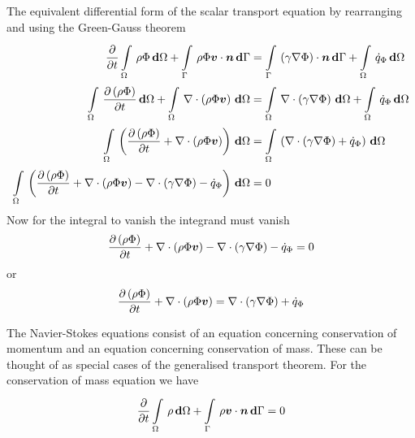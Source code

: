 The equivalent differential form of the scalar transport equation by
rearranging  and using the Green-Gauss
theorem \ie
\begin{equation}
  \begin{split}
    \delby{}{t}\gint{\Omega}{}{\rho\Phi}{\Omega}+\gint{\Gamma}{}{\dotprod{\rho\Phi\vectr{v}}{\vectr{n}}}{\Gamma}
    &=\gint{\Gamma}{}{\dotprod{\pbrac{\gamma\gradient{}{\Phi}}}{\vectr{n}}}{\Gamma}+\gint{\Omega}{}{\dot{q}_{\Phi}}{\Omega}\\
    \gint{\Omega}{}{\delby{\pbrac{\rho\Phi}}{t}}{\Omega}+\gint{\Omega}{}{\divergence{}{\pbrac{\rho\Phi\vectr{v}}}}{\Omega}
    &=\gint{\Omega}{}{\divergence{}{\pbrac{\gamma\gradient{}{\Phi}}}}{\Omega}+\gint{\Omega}{}{\dot{q}_{\Phi}}{\Omega}
    \\
    \gint{\Omega}{}{\pbrac{\delby{\pbrac{\rho\Phi}}{t}+\divergence{}{\pbrac{\rho\Phi\vectr{v}}}}}{\Omega}
    &=\gint{\Omega}{}{\pbrac{\divergence{}{\pbrac{\gamma\gradient{}{\Phi}}}+\dot{q}_{\Phi}}}{\Omega}
    \\
    \gint{\Omega}{}{\pbrac{\delby{\pbrac{\rho\Phi}}{t}+\divergence{}{\pbrac{\rho\Phi\vectr{v}}}-\divergence{}{\pbrac{\gamma\gradient{}{\Phi}}}-\dot{q}_{\Phi}}}{\Omega}
    &= 0
  \end{split}
\end{equation}
Now for the integral to vanish the integrand must vanish \ie
\begin{equation}
  \delby{\pbrac{\rho\Phi}}{t}+\divergence{}{\pbrac{\rho\Phi\vectr{v}}}
  -\divergence{}{\pbrac{\gamma\gradient{}{\Phi}}}-\dot{q}_{\Phi}=0
\end{equation}
or
\begin{equation}
  \delby{\pbrac{\rho\Phi}}{t}+\divergence{}{\pbrac{\rho\Phi\vectr{v}}}=\divergence{}{\pbrac{\gamma\gradient{}{\Phi}}}+\dot{q}_{\Phi}
  \label{eqn:differentialgenscalartransport}
\end{equation}

The Navier-Stokes equations consist of an equation concerning conservation of
momentum and an equation concerning conservation of mass. These can be thought
of as special cases of the generalised transport theorem. For the conservation
of mass equation we have
\begin{equation}
  \delby{}{t}\gint{\Omega}{}{\rho}{\Omega}+\gint{\Gamma}{}{\dotprod{\rho\vectr{v}}{\vectr{n}}}{\Gamma}=0
  \label{eqn:integralconservationofmass}
\end{equation}


